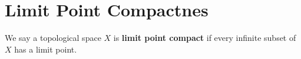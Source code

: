 \section{Limit Point Compactnes}

\begin{definition}
    We say a topological space $X$ is \textbf{limit point compact} if every
    infinite subset of $X$ has a limit point.
\end{definition}
